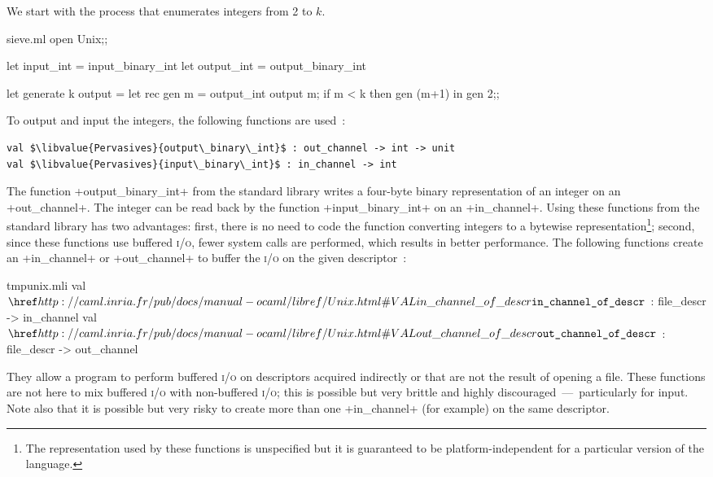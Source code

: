 
We start with the process that enumerates integers from 2 to $k$.
%
\begin{listingcodefile}{sieve.ml}
open Unix;;

let input_int = input_binary_int
let output_int = output_binary_int

let generate k output =
  let rec gen m =
    output_int output m;
    if m < k then gen (m+1)
  in 
  gen 2;;
\end{listingcodefile}
To output and input the integers, the following functions are used~:
%
\begin{lstlisting}
val $\libvalue{Pervasives}{output\_binary\_int}$ : out_channel -> int -> unit
val $\libvalue{Pervasives}{input\_binary\_int}$ : in_channel -> int
\end{lstlisting}
%
The function \ml+output_binary_int+ from the standard library writes a
four-byte binary representation of an integer on an
\ml+out_channel+. The integer can be read back by the function
\ml+input_binary_int+ on an \ml+in_channel+. Using these functions
from the standard library has two advantages: first, there is no need to
code the function converting integers to a bytewise
representation\footnote{The representation used by these functions is
  unspecified but it is guaranteed to be platform-independent for a
  particular version of the language.}; second, since
these functions use buffered \textsc{i/o}, fewer system calls are
performed, which results in better performance. The following functions
create an \ml+in_channel+ or \ml+out_channel+ to buffer the
\textsc{i/o} on the given descriptor~:
%
\begin{listingcodefile}{tmpunix.mli}
val $\indexlibvalue{Unix}{in\_channel\_of\_descr}$ : file_descr -> in_channel
val $\indexlibvalue{Unix}{out\_channel\_of\_descr}$ : file_descr -> out_channel
\end{listingcodefile}
%
They allow a program to perform buffered \textsc{i/o} on descriptors acquired
indirectly or that are not the result of opening a file. These
functions are not here to mix buffered \textsc{i/o} with non-buffered
\textsc{i/o}; this is possible but very brittle and highly
discouraged~---~particularly for input. Note also that it is possible
but very risky to create more than one \ml+in_channel+ (for example)
on the same descriptor.


